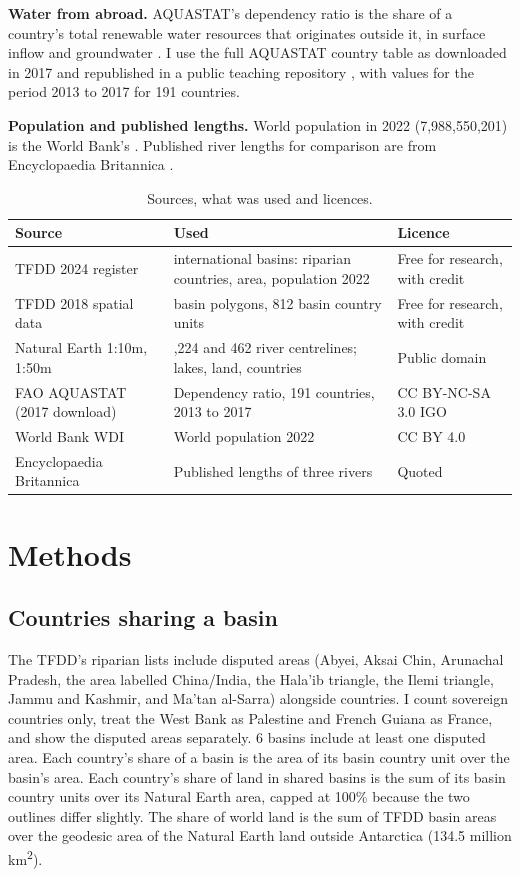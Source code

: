 \documentclass[11pt,a4paper]{article}
\begin{document}
\textbf{Water from abroad.} AQUASTAT's dependency ratio is the share of a country's total renewable water resources that originates outside it, in surface inflow and groundwater \citep{aquastat}. I use the full AQUASTAT country table as downloaded in 2017 and republished in a public teaching repository \citep{pycon}, with values for the period 2013 to 2017 for 191 countries.

\textbf{Population and published lengths.} World population in 2022 (7,988,550,201) is the World Bank's \citep{wb}. Published river lengths for comparison are from Encyclopaedia Britannica \citep{brit_nile,brit_amazon,brit_yangtze}.

\begin{table}[tbp]\centering\small\caption{Sources, what was used and licences.}\label{tab:sources}\begin{tabular}{>{\raggedright\arraybackslash}p{3.4cm}>{\raggedright\arraybackslash}p{6.9cm}>{\raggedright\arraybackslash}p{3.6cm}}\toprule Source & Used & Licence\\\midrule
TFDD 2024 register & 313 international basins: riparian countries, area, population 2022 & Free for research, with credit\\
TFDD 2018 spatial data & 310 basin polygons, 812 basin country units & Free for research, with credit\\
Natural Earth 1:10m, 1:50m & 4,224 and 462 river centrelines; lakes, land, countries & Public domain\\
FAO AQUASTAT (2017 download) & Dependency ratio, 191 countries, 2013 to 2017 & CC BY-NC-SA 3.0 IGO\\
World Bank WDI & World population 2022 & CC BY 4.0\\
Encyclopaedia Britannica & Published lengths of three rivers & Quoted\\
\bottomrule\end{tabular}\end{table}

\section{Methods}
\subsection{Countries sharing a basin}
The TFDD's riparian lists include disputed areas (Abyei, Aksai Chin, Arunachal Pradesh, the area labelled China/India, the Hala'ib triangle, the Ilemi triangle, Jammu and Kashmir, and Ma'tan al-Sarra) alongside countries. I count sovereign countries only, treat the West Bank as Palestine and French Guiana as France, and show the disputed areas separately. 6 basins include at least one disputed area. Each country's share of a basin is the area of its basin country unit over the basin's area. Each country's share of land in shared basins is the sum of its basin country units over its Natural Earth area, capped at 100\% because the two outlines differ slightly. The share of world land is the sum of TFDD basin areas over the geodesic area of the Natural Earth land outside Antarctica (134.5 million km\textsuperscript{2}).
\end{document}
